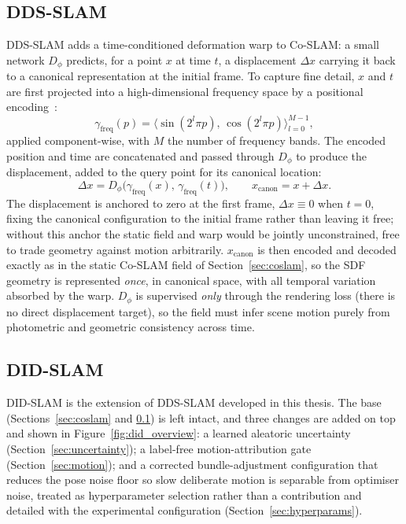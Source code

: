 \documentclass{article}
\begin{document}
\subsection{DDS-SLAM}
\label{sec:ddsslam}
DDS-SLAM adds a time-conditioned deformation warp to Co-SLAM: a small network $D_\phi$ predicts, for a point $x$ at time $t$, a displacement $\Delta x$ carrying it back to a canonical representation at the initial frame. To capture fine detail, $x$ and $t$ are first projected into a high-dimensional frequency space by a positional encoding~\cite{Mildenhall2020}:
\begin{equation}
    \gamma_{\text{freq}}(p) = \big\langle \sin(2^l\pi p),\, \cos(2^l\pi p) \big\rangle_{l=0}^{M-1},
    \label{eq:posenc}
\end{equation}
applied component-wise, with $M$ the number of frequency bands. The encoded position and time are concatenated and passed through $D_\phi$ to produce the displacement, added to the query point for its canonical location:
\begin{equation}
    \Delta x = D_\phi\big(\gamma_{\text{freq}}(x),\, \gamma_{\text{freq}}(t)\big),
    \qquad x_{\text{canon}} = x + \Delta x .
    \label{eq:warp}
\end{equation}
The displacement is anchored to zero at the first frame, $\Delta x \equiv 0$ when $t = 0$, fixing the canonical configuration to the initial frame rather than leaving it free; without this anchor the static field and warp would be jointly unconstrained, free to trade geometry against motion arbitrarily. $x_{\text{canon}}$ is then encoded and decoded exactly as in the static Co-SLAM field of Section~\ref{sec:coslam}, so the SDF geometry is represented \emph{once}, in canonical space, with all temporal variation absorbed by the warp. $D_\phi$ is supervised \emph{only} through the rendering loss (there is no direct displacement target), so the field must infer scene motion purely from photometric and geometric consistency across time.

\subsection{DID-SLAM}
\label{sec:didslam}
DID-SLAM is the extension of DDS-SLAM developed in this thesis. The base (Sections~\ref{sec:coslam} and \ref{sec:ddsslam}) is left intact, and three changes are added on top and shown in Figure~\ref{fig:did_overview}: a learned aleatoric uncertainty (Section~\ref{sec:uncertainty}); a label-free motion-attribution gate (Section~\ref{sec:motion}); and a corrected bundle-adjustment configuration that reduces the pose noise floor so slow deliberate motion is separable from optimiser noise, treated as hyperparameter selection rather than a contribution and detailed with the experimental configuration (Section~\ref{sec:hyperparams}).
\end{document}
